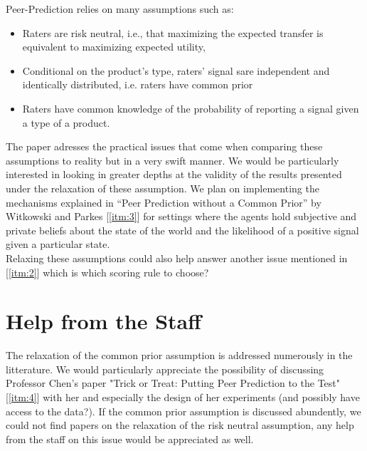 \documentclass{scrartcl}
\begin{document}
Peer-Prediction relies on many assumptions such as:
\begin{itemize}
\item Raters are risk neutral, i.e., that maximizing the expected transfer is equivalent to maximizing expected utility,
\item Conditional on the product’s type, raters’ signal sare independent and identically distributed, i.e. raters have common prior
\item Raters have common knowledge of the probability of reporting a signal given a type of a product.
\end{itemize}
The paper adresses the practical issues that come when comparing these assumptions to reality but in a very swift manner. We would be particularly interested in looking in greater depths at the validity of the results presented under the relaxation of these assumption. We plan on implementing the mechanisms explained in ``Peer Prediction without a Common Prior'' by Witkowski and Parkes [\ref{itm:3}] for settings where the agents hold subjective and private beliefs about the state of the world and the likelihood of a positive signal given a particular state.\\

Relaxing these assumptions could also help answer another issue mentioned in [\ref{itm:2}] which is which scoring rule to choose? 

\section{Help from the Staff}

The relaxation of the common prior assumption is addressed numerously in the litterature. We would particularly appreciate the possibility of discussing Professor Chen's paper "Trick or Treat: Putting Peer Prediction to the Test" [\ref{itm:4}] with her and especially the design of her experiments (and possibly have access to the data?). If the common prior assumption is discussed abundently, we could not find papers on the relaxation of the risk neutral assumption, any help from the staff on this issue would be appreciated as well.
\end{document}
